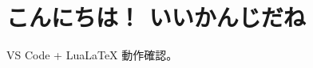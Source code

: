 \documentclass{ltjsarticle}      %
\begin{document}
\section{こんにちは！ いいかんじだね}
VS Code + LuaLaTeX 動作確認。
\end{document}
